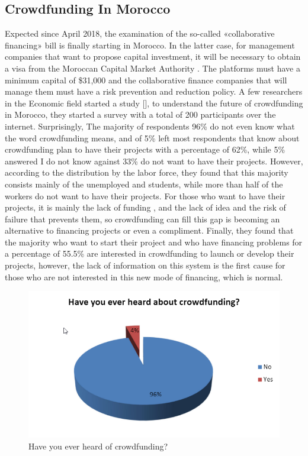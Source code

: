 \subsection*{ Crowdfunding In Morocco }
Expected since April 2018, the examination of the so-called «collaborative financing» bill is finally starting in Morocco. In the latter case, for management companies that want to propose capital investment, it will be necessary to obtain a visa from the Moroccan Capital Market Authority . The platforms must have a minimum capital of \$31,000 and the collaborative finance companies that will manage them must have a risk prevention and reduction policy.
A few researchers in the Economic field started a study [\cite{crowdMorocco}], to understand the future of crowdfunding in Morocco, they started a survey with a total of 200 participants over the internet. Surprisingly,  The majority of respondents 96\% do not even know what the word crowdfunding means, and of 5\% left most respondents that know about crowdfunding plan to have their projects with a percentage of 62\%, while 5\% answered I do not know against 33\% do not want to have their projects. However, according to the distribution by the labor force, they found that this majority consists mainly of the unemployed and students, while more than half of the workers do not want to have their projects. For those who want to have their projects, it is mainly the lack of funding , and the lack of idea and the risk of failure that prevents them, so crowdfunding can fill this gap is becoming an alternative to financing projects or even a compliment. Finally, they found that the majority who want to start their project and who have financing problems for a percentage of 55.5\% are interested in crowdfunding to launch or develop their projects, however, the lack of information on this system is the first cause for those who are not interested in this new mode of financing, which is normal.


\begin{figure}[!ht]
      \center
      \includegraphics[scale=0.60]{assets/heardCrowd.png}
      \caption{ Have you ever heard of crowdfunding? }
      \label{fig:heardCrowd}
\end{figure}

